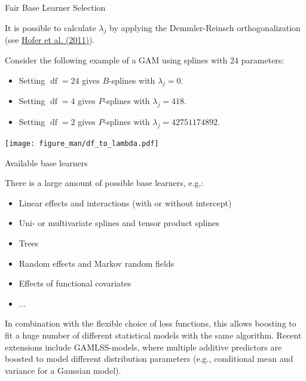 \begin{vbframe}{Fair Base Learner Selection}
\begin{itemize}
\end{itemize}

\framebreak


It is possible to calculate $\lambda_j$ by applying the Demmler-Reinsch 
orthogonalization (see 
\href{https://www.tandfonline.com/doi/abs/10.1198/jcgs.2011.09220}
{Hofer et al. (2011)}).


Consider the following example of a GAM using splines with 24 parameters:

\begin{itemize}

  \item
    Setting $\operatorname{df} = 24$ gives $B$-splines with $\lambda_j = 0$.

  \item
    Setting $\operatorname{df} = 4$ gives $P$-splines with $\lambda_j = 418$.

  \item
    Setting $\operatorname{df} = 2$ gives $P$-splines with $\lambda_j = 42751174892$.

\end{itemize}

\begin{center}
\texttt{[image: figure\_man/df\_to\_lambda.pdf]}
\end{center}

\end{vbframe}


\begin{vbframe}{Available base learners}

There is a large amount of possible base learners, e.g.:

\begin{itemize}
  \item Linear effects and interactions (with or without intercept)
  \item Uni- or multivariate splines and tensor product splines
  \item Trees
  \item Random effects and Markov random fields
  \item Effects of functional covariates
  \item ...
\end{itemize}

\lz

In combination with the flexible choice of loss functions, this allows boosting to fit  a huge number of different statistical models with the same algorithm. Recent extensions include GAMLSS-models, where multiple additive predictors are boosted to model different distribution parameters (e.g., conditional mean and variance for a Gaussian model).

\end{vbframe}

